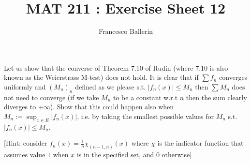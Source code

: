 \documentclass[11pt]{article}%
\title{MAT 211 : Exercise Sheet 12}
\author{Francesco Ballerin}
\date{\color{gray}{\small{francesco.ballerin@uib.no}}}
\begin{document}
\begin{minipage}[t]{\dimexpr \textwidth-6cm-\columnsep}
     \maketitle
\end{minipage}
\hfill\noindent{}

\vspace{50pt}

\begin{Exercise}[title={*}]
	Let us show that the converse of Theorem 7.10 of Rudin (where 7.10 is also known as the Weierstrass M-test) does not hold. It is clear that if $\sum f_n$ converges uniformly and $(M_n)_n$ defined as we please s.t. $\lvert f_n(x)\rvert \leq M_n$ then $\sum M_n$ does not need to converge (if we take $M_n$ to be a constant w.r.t $n$ then the sum clearly diverges to $+\infty$). Show that this could happen also when $M_n:= \sup_{x\in E} \lvert f_n(x)\rvert$, i.e. by taking the smallest possible values for $M_n$ s.t. $\lvert f_n(x)\rvert \leq M_n$.
	
	\bigskip
	
	[Hint: consider $f_n (x) = \frac{1}{n} \chi_{(n-1,n)}(x)$ where $\chi$ is the indicator function that assumes value $1$ when $x$ is in the specified set, and $0$ otherwise]
\end{Exercise}
\end{document}
